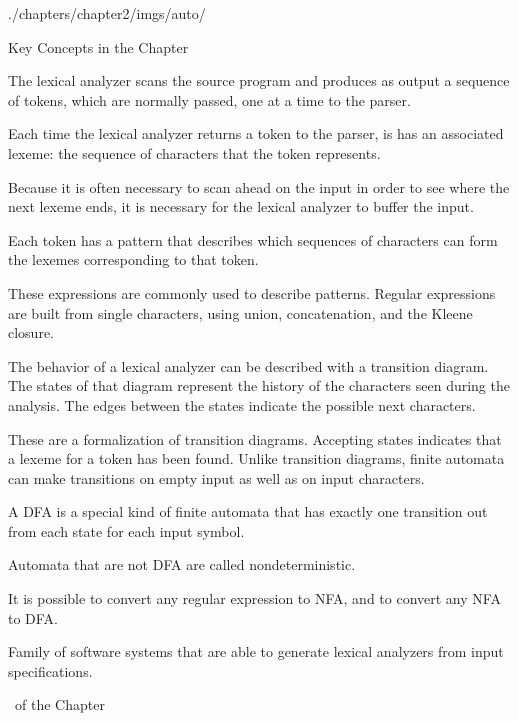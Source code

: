 \begin{graphicspathcontext}{{./chapters/chapter2/imgs/auto/}}
\begin{bibunit}[apalike]
\begin{frame}[t]{Key Concepts in the Chapter}
	\begin{description}\small
	\item[Tokens] The lexical analyzer scans the source program and produces as output a sequence of tokens, which are normally passed, one at a time to the parser.
	\item[Lexemes] Each time the lexical analyzer returns a token to the parser, is has an associated lexeme: the sequence of characters that the token represents.
	\item[Buffering] Because it is often necessary to scan ahead on the input in order to see where the next lexeme ends, it is necessary for the lexical analyzer to buffer the input.
	\item[Patterns] Each token has a pattern that describes which sequences of characters can form the lexemes corresponding to that token.
	\item[Regular Expressions] These expressions are commonly used to describe patterns. Regular expressions are built from single characters, using union, concatenation, and the Kleene closure.
	\item[Transition Diagram] The behavior of a lexical analyzer can be described with a transition diagram. The states of that diagram represent the history of the characters seen during the analysis. The edges between the states indicate the possible next characters.
	\item[Finite Automata] These are a formalization of transition diagrams. Accepting states indicates that a lexeme for a token has been found. Unlike transition diagrams, finite automata can make transitions on empty input as well as on input characters.
	\item[Deterministic Finite Automata] A DFA is a special kind of finite automata that has exactly one transition out from each state for each input symbol.
	\item[Nondeterministic Finite Automata] Automata that are not DFA are called nondeterministic.
	\item[Conversion Among Pattern Representations] It is possible to convert any regular expression to NFA, and to convert any NFA to DFA.
	\item[Lex] Family of software systems that are able to generate lexical analyzers from input specifications.
	\end{description}
\end{frame}

\begin{frame}[t]{\bibname\ of the Chapter}%
	\tiny%
\end{frame}%

\end{bibunit}
\end{graphicspathcontext}
